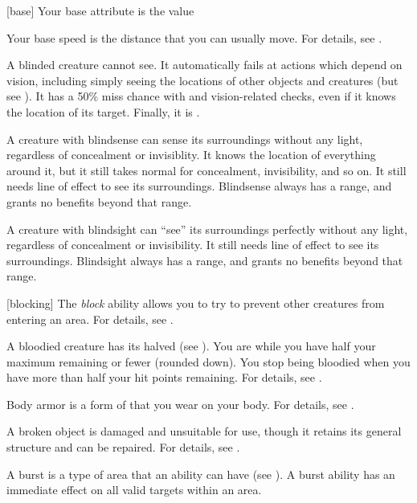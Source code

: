 [base] Your base attribute is the value 

 Your base speed is the distance that you can usually move.
For details, see .

 A blinded creature cannot see. It automatically fails at actions which depend on vision, including simply seeing the locations of other objects and creatures (but see ). It has a 50\% miss chance with  and vision-related checks, even if it knows the location of its target. Finally, it is .

 A creature with blindsense can sense its surroundings without any light, regardless of concealment or invisiblity.
It knows the location of everything around it, but it still takes normal  for concealment, invisibility, and so on.
It still needs line of effect to see its surroundings.
Blindsense always has a range, and grants no benefits beyond that range.

 A creature with blindsight can ``see'' its surroundings perfectly without any light, regardless of concealment or invisibility.
It still needs line of effect to see its surroundings.
Blindsight always has a range, and grants no benefits beyond that range.

[blocking] The \textit{block} ability allows you to try to prevent other creatures from entering an area.
For details, see .

 A bloodied creature has its  halved (see ).
You are  while you have half your maximum  remaining or fewer (rounded down).
You stop being bloodied when you have more than half your hit points remaining.
For details, see .

 Body armor is a form of  that you wear on your body.
For details, see .

 A broken object is damaged and unsuitable for use, though it retains its general structure and can be repaired.
For details, see .

 A burst is a type of area that an ability can have (see ).
A burst ability has an immediate effect on all valid targets within an area.

